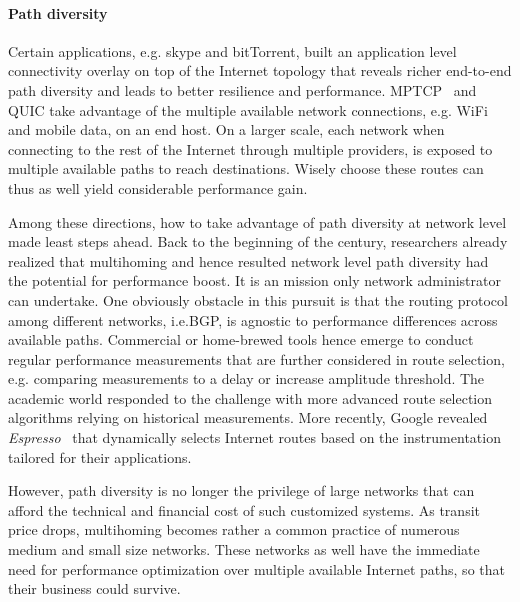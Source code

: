 \paragraph*{Path diversity} Certain applications, e.g. skype and bitTorrent, built an application level connectivity overlay on top of the Internet topology that reveals richer end-to-end path diversity and leads to better resilience and performance.
MPTCP~\cite{Han2006} and QUIC take advantage of the multiple available network connections, e.g. WiFi and mobile data, on an end host.
On a larger scale, each network when connecting to the rest of the Internet through multiple providers, is exposed to multiple available paths to reach destinations. Wisely choose these routes can thus as well yield considerable performance gain.

Among these directions, how to take advantage of path diversity at network level made least steps ahead.
Back to the beginning of the century, researchers already realized that multihoming and hence resulted network level path diversity had the potential for performance boost. It is an mission only network administrator can undertake.
One obviously obstacle in this pursuit is that the routing protocol among different networks, i.e.\acf{BGP}, is agnostic to performance differences across available paths.
Commercial or home-brewed tools hence emerge to conduct regular performance measurements that are further considered in route selection, e.g. comparing measurements to a delay or increase amplitude threshold.
The academic world responded to the challenge with more advanced route selection algorithms relying on historical measurements.
More recently, Google revealed \textit{Espresso}~\cite{espresso} that dynamically selects Internet routes based on the instrumentation tailored for their applications.

However, path diversity is no longer the privilege of large networks that can afford the technical and financial cost of such customized systems.
As transit price drops, multihoming becomes rather a common practice of numerous medium and small size networks. 
These networks as well have the immediate need for performance optimization over multiple available Internet paths, so that their business could survive.

